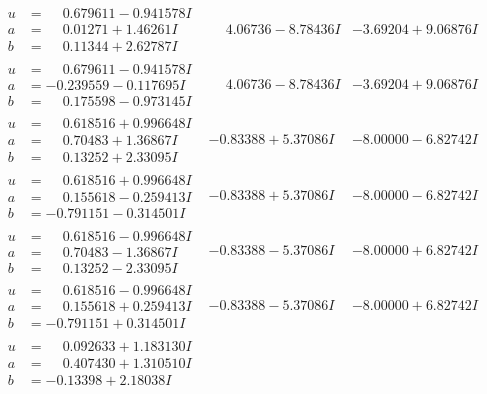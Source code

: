 \documentclass[1p]{elsarticle_modified}
\theoremstyle{definition}
\begin{document}
$$\begin{array}{c|c|c}
\begin{aligned}
u &= \phantom{-}0.679611 - 0.941578 I \\
a &= \phantom{-}0.01271 + 1.46261 I \\
b &= \phantom{-}0.11344 + 2.62787 I\end{aligned}
 & \phantom{-}4.06736 - 8.78436 I & -3.69204 + 9.06876 I \\ \hline\begin{aligned}
u &= \phantom{-}0.679611 - 0.941578 I \\
a &= -0.239559 - 0.117695 I \\
b &= \phantom{-}0.175598 - 0.973145 I\end{aligned}
 & \phantom{-}4.06736 - 8.78436 I & -3.69204 + 9.06876 I \\ \hline\begin{aligned}
u &= \phantom{-}0.618516 + 0.996648 I \\
a &= \phantom{-}0.70483 + 1.36867 I \\
b &= \phantom{-}0.13252 + 2.33095 I\end{aligned}
 & -0.83388 + 5.37086 I & -8.00000 - 6.82742 I \\ \hline\begin{aligned}
u &= \phantom{-}0.618516 + 0.996648 I \\
a &= \phantom{-}0.155618 - 0.259413 I \\
b &= -0.791151 - 0.314501 I\end{aligned}
 & -0.83388 + 5.37086 I & -8.00000 - 6.82742 I \\ \hline\begin{aligned}
u &= \phantom{-}0.618516 - 0.996648 I \\
a &= \phantom{-}0.70483 - 1.36867 I \\
b &= \phantom{-}0.13252 - 2.33095 I\end{aligned}
 & -0.83388 - 5.37086 I & -8.00000 + 6.82742 I \\ \hline\begin{aligned}
u &= \phantom{-}0.618516 - 0.996648 I \\
a &= \phantom{-}0.155618 + 0.259413 I \\
b &= -0.791151 + 0.314501 I\end{aligned}
 & -0.83388 - 5.37086 I & -8.00000 + 6.82742 I \\ \hline\begin{aligned}
u &= \phantom{-}0.092633 + 1.183130 I \\
a &= \phantom{-}0.407430 + 1.310510 I \\
b &= -0.13398 + 2.18038 I\end{aligned}

\end{array}$$
\end{document}

